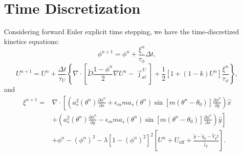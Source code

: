 \documentclass[10pt]{article}
\begin{document}
\section{Time Discretization}
Considering forward Euler explicit time stepping, we have the time-discretized kinetics equations:
\begin{equation}
\phi^{n+1}=\phi^{n} + \frac{\xi^n}{\tau_\phi}\Delta t,
\end{equation}
\begin{equation}
U^{n+1}=U^{n}+\frac{\Delta t}{\tau_U}\left\{\nabla \cdot \left[ \tilde{D}\frac{1-\phi^n}{2} \nabla U^n - \vec{\jmath}_{at}^{\,U} \right] + \frac{1}{2}[1+(1-k)U^n]\frac{\xi^n}{\tau_\phi} \right\},
\label{ueq_td}
\end{equation}
and
\begin{equation}
\begin{split}
\xi^{n+1} = & \nabla \cdot  \left[ \left(a_s^2(\theta^n) \frac{\partial \phi^n}{\partial x} + \epsilon_m m a_s(\theta^n) \sin \left[ m \left(\theta^n - \theta_0 \right) \right] \frac{\partial \phi^n}{\partial y}\right)\hat{x} \right. \\ 
& \left . + \left(a_s^2(\theta^n) \frac{\partial \phi^n}{\partial y} - \epsilon_m m a_s(\theta^n) \sin \left[ m \left(\theta^n - \theta_0 \right) \right] \frac{\partial \phi^n}{\partial x}\right)\hat{y}\right] \\
& +\phi^n-{(\phi^n)}^3 - \lambda {\left[1-{(\phi^n)}^2\right]}^2 \left[ U^n + U_\text{off} + \frac{\tilde{y} - \tilde{y}_0 - \tilde{V}_p t}{\tilde{l}_T} \right].
\end{split}
\end{equation}
\end{document}
